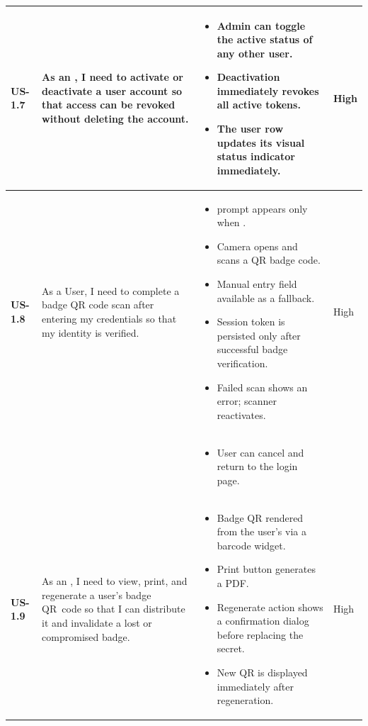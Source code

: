 \begin{longtable}{p{1.5cm} p{5cm} p{6.5cm} p{2cm}}
	\textbf{US-1.7} &
	As an \userrole{Administrator}, I need to activate or deactivate a user
	account so that access can be revoked without deleting the account.
	&
	\begin{itemize}[nosep, leftmargin=*]
	\item Admin can toggle the active status of any other user.
	\item Deactivation immediately revokes all active tokens.
	\item The user row updates its visual status indicator immediately.
	\end{itemize}
	&
	High \\ \midrule

	\textbf{US-1.8} &
	As a User,
	I need to complete a badge QR code scan after entering my credentials so
	that my identity is verified.
	&
	\begin{itemize}[nosep, leftmargin=*]
	\item \domainterm{2FA} prompt appears only when \domainterm{TwoFA Enabled}.
	\item Camera opens and scans a QR badge code.
	\item Manual entry field available as a fallback.
	\item Session token is persisted only after successful badge verification.
	\item Failed scan shows an error; scanner reactivates.
	\end{itemize} & High \\ & &
	\begin{itemize}[nosep, leftmargin=*]
	\item User can cancel and return to the login page.
	\end{itemize}
	& \\ \midrule

	\textbf{US-1.9} &
	As an \userrole{Administrator}, I need to view, print, and regenerate a
	user's badge QR~code so that I can distribute it and invalidate a lost or
	compromised badge.
	&
	\begin{itemize}[nosep, leftmargin=*]
	\item Badge QR rendered from the user's \domainterm{Badge Secret} via a barcode widget.
	\item Print button generates a PDF.
	\item Regenerate action shows a confirmation dialog before replacing the secret.
	\item New QR is displayed immediately after regeneration.
	\end{itemize}
	&
	High \\ \midrule


\end{longtable}
